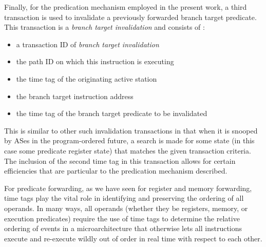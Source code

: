 \documentclass[10pt,dvips]{article}
\begin{document}
Finally, for the predication mechanism employed in the present
work, a third transaction is used to invalidate a previously
forwarded branch target predicate.  This transaction is
a \textit{branch target invalidation} and consists of :
%
\begin{itemize}
\vspace{-0.05in}
\item{a transaction ID of \textit{branch target invalidation}}
\vspace{-0.05in}
\item{the path ID on which this instruction is executing}
\vspace{-0.05in}
\item{the time tag of the originating active station}
\vspace{-0.05in}
\item{the branch target instruction address}
\vspace{-0.05in}
\item{the time tag of the branch target predicate to be invalidated}
\vspace{-0.05in}
\end{itemize}   
%
This is similar to other such invalidation transactions in
that when it is snooped by ASes in the program-ordered future,
a search is made for some state (in this case some predicate
register state) that matches the given transaction criteria.
The inclusion of the second time tag in this transaction allows
for certain efficiencies that are particular to the predication
mechanism described.

For predicate forwarding, as we have seen for register and
memory forwarding, time tags play the vital role in
identifying and preserving the ordering of all operands.
In many ways, all operands (whether they be registers, memory,
or execution predicates) require the use of time tags to
determine the relative ordering of events in a microarchitecture
that otherwise lets all instructions execute and re-execute
wildly out of order in real time with respect to each other.
%
%
\end{document}
